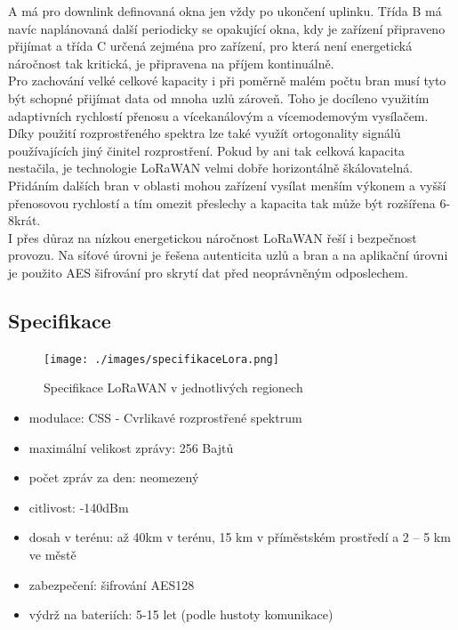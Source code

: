 \documentclass{ctuthesis}
\begin{document}
A má pro downlink definovaná okna jen vždy po ukončení uplinku. Třída B má navíc
naplánovaná další periodicky se opakující okna, kdy je zařízení připraveno přijímat a třída C
určená zejména pro zařízení, pro která není energetická náročnost tak kritická, je připravena na
příjem kontinuálně.\\
Pro zachování velké celkové kapacity i při poměrně malém počtu bran musí tyto být schopné
přijímat data od mnoha uzlů zároveň. Toho je docíleno využitím adaptivních rychlostí přenosu
a vícekanálovým a vícemodemovým vysílačem. Díky použití rozprostřeného spektra lze také
využít ortogonality signálů používajících jiný činitel rozprostření. Pokud by ani tak celková
kapacita nestačila, je technologie LoRaWAN velmi dobře horizontálně škálovatelná. Přidáním
dalších bran v oblasti mohou zařízení vysílat menším výkonem a vyšší přenosovou rychlostí a
tím omezit přeslechy a kapacita tak může být rozšířena 6-8krát.\\
I přes důraz na nízkou energetickou náročnost LoRaWAN řeší i bezpečnost provozu. Na síťové
úrovni je řešena autenticita uzlů a bran a na aplikační úrovni je použito AES šifrování pro skrytí
dat před neoprávněným odposlechem.
\subsection{Specifikace}
\begin{figure}
\caption{Specifikace LoRaWAN v jednotlivých regionech \cite{loraalliance2}}
\texttt{[image: ./images/specifikaceLora.png]}
\label{fig:loraSpec}
\end{figure}
\begin{itemize}
\item
modulace: CSS - Cvrlikavé rozprostřené spektrum
\item
maximální velikost zprávy: 256 Bajtů
\item
počet zpráv za den: neomezený
\item
citlivost: -140dBm
\item
dosah v terénu: až 40km v terénu, 15 km v příměstském prostředí a 2 – 5 km ve městě
\item
zabezpečení: šifrování AES128
\item
výdrž na bateriích: 5-15 let (podle hustoty komunikace) \cite{iotportalLora}
\end{itemize}
\end{document}
